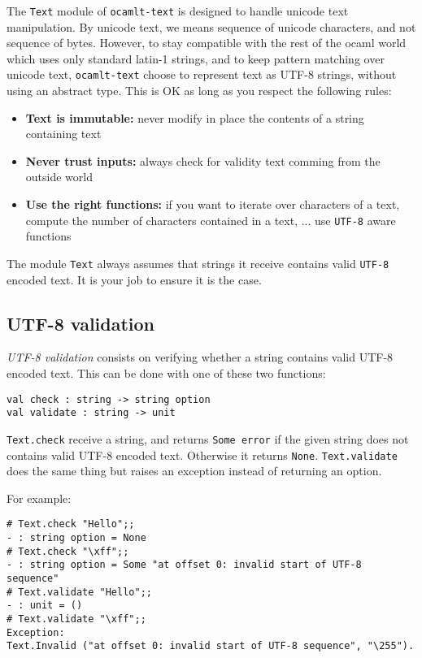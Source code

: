 \documentclass{article}
\newcommand{\oct}{\texttt{ocamlt-text}\xspace}
\begin{document}
The \texttt{Text} module of \oct is designed to handle unicode text
manipulation. By unicode text, we means sequence of unicode
characters, and not sequence of bytes. However, to stay compatible
with the rest of the ocaml world which uses only standard latin-1
strings, and to keep pattern matching over unicode text, \oct choose
to represent text as UTF-8 strings, without using an abstract
type. This is OK as long as you respect the following rules:

\begin{itemize}
\item \textbf{Text is immutable:} never modify in place the contents of
  a string containing text
\item \textbf{Never trust inputs:} always check for
  validity text comming from the outside world
\item \textbf{Use the right functions:} if you want to iterate over
  characters of a text, compute the number of characters contained
  in a text, ...  use \texttt{UTF-8} aware functions
\end{itemize}

The module \texttt{Text} always assumes that strings it receive
contains valid \texttt{UTF-8} encoded text. It is your job to ensure
it is the case.

\subsection{UTF-8 validation}

\emph{UTF-8 validation} consists on verifying whether a string
contains valid UTF-8 encoded text. This can be done with one of these
two functions:

\begin{verbatim}
val check : string -> string option
val validate : string -> unit
\end{verbatim}

\texttt{Text.check} receive a string, and returns \texttt{Some error}
if the given string does not contains valid UTF-8 encoded
text. Otherwise it returns \texttt{None}. \texttt{Text.validate} does
the same thing but raises an exception instead of returning an option.

For example:

\begin{verbatim}
# Text.check "Hello";;
- : string option = None
# Text.check "\xff";;
- : string option = Some "at offset 0: invalid start of UTF-8 sequence"
# Text.validate "Hello";;
- : unit = ()
# Text.validate "\xff";;
Exception:
Text.Invalid ("at offset 0: invalid start of UTF-8 sequence", "\255").
\end{verbatim}
\end{document}
